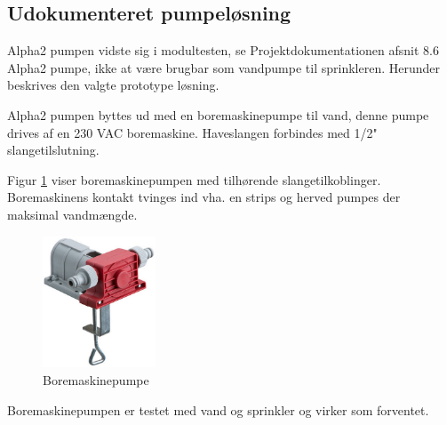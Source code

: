 
\subsection{Udokumenteret pumpeløsning}
\label{sec:Udokumenteretpumpeloesning}

Alpha2 pumpen vidste sig i modultesten, se Projektdokumentationen afsnit 8.6 Alpha2 pumpe, ikke at være brugbar som vandpumpe til sprinkleren. Herunder beskrives den valgte prototype løsning.

Alpha2 pumpen byttes ud med en boremaskinepumpe til vand, denne pumpe drives af en 230 VAC boremaskine. Haveslangen forbindes med 1/2" slangetilslutning. 

Figur \ref{fig:boremaskinepumpe} viser boremaskinepumpen med tilhørende slangetilkoblinger. Boremaskinens kontakt tvinges ind vha. en strips og herved pumpes der maksimal vandmængde. 

\begin{figure}[h]
  \centering
    \includegraphics[width=0.3\textwidth]{Billeder/boremaskinepumpe}
    \caption{Boremaskinepumpe}
    \label{fig:boremaskinepumpe}
\end{figure}

Boremaskinepumpen er testet med vand og sprinkler og virker som forventet. 